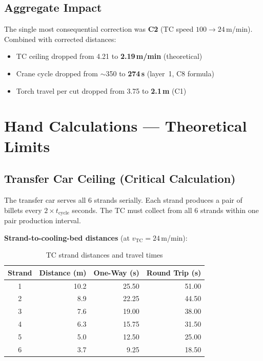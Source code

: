 \documentclass[11pt,a4paper]{article}
\begin{document}
\subsection{Aggregate Impact}

The single most consequential correction was \textbf{C2} (TC speed $100 \to 24$\,m/min). Combined with corrected distances:
\begin{itemize}
    \item TC ceiling dropped from 4.21 to \textbf{2.19\,m/min} (theoretical)
    \item Crane cycle dropped from $\sim$350 to \textbf{274\,s} (layer~1, C8 formula)
    \item Torch travel per cut dropped from 3.75 to \textbf{2.1\,m} (C1)
\end{itemize}

\section{Hand Calculations --- Theoretical Limits}
\label{sec:hand-calcs}

\subsection{Transfer Car Ceiling (Critical Calculation)}

The transfer car serves all 6 strands serially. Each strand produces a pair of billets every $2 \times t_\text{cycle}$ seconds. The TC must collect from all 6 strands within one pair production interval.

\textbf{Strand-to-cooling-bed distances} (at $v_\text{TC} = 24$\,m/min):

\begin{table}[H]
\centering
\caption{TC strand distances and travel times}
\label{tab:tc-distances}
\begin{tabular}{@{}crrr@{}}
\toprule
Strand & Distance (m) & One-Way (s) & Round Trip (s) \\
\midrule
1 & 10.2 & 25.50 & 51.00 \\
2 & 8.9 & 22.25 & 44.50 \\
3 & 7.6 & 19.00 & 38.00 \\
4 & 6.3 & 15.75 & 31.50 \\
5 & 5.0 & 12.50 & 25.00 \\
6 & 3.7 & 9.25 & 18.50 \\
\bottomrule
\end{tabular}
\end{table}
\end{document}
